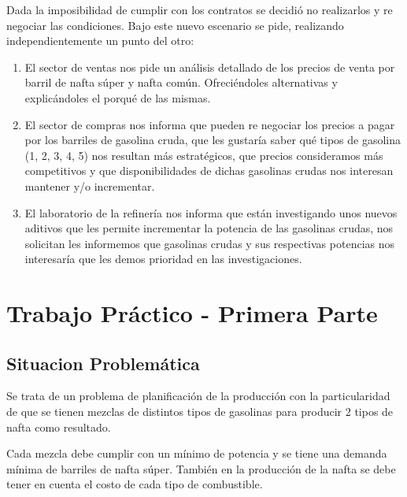 \documentclass[
]{article}
\begin{document}
Dada la imposibilidad de cumplir con los contratos se decidió no
realizarlos y re negociar las condiciones. Bajo este nuevo escenario se
pide, realizando independientemente un punto del otro:

\begin{enumerate}
\def\labelenumi{\arabic{enumi}.}
\item
  El sector de ventas nos pide un análisis detallado de los precios de
  venta por barril de nafta súper y nafta común. Ofreciéndoles
  alternativas y explicándoles el porqué de las mismas.
\item
  El sector de compras nos informa que pueden re negociar los precios a
  pagar por los barriles de gasolina cruda, que les gustaría saber qué
  tipos de gasolina (1, 2, 3, 4, 5) nos resultan más estratégicos, que
  precios consideramos más competitivos y que disponibilidades de dichas
  gasolinas crudas nos interesan mantener y/o incrementar.
\item
  El laboratorio de la refinería nos informa que están investigando unos
  nuevos aditivos que les permite incrementar la potencia de las
  gasolinas crudas, nos solicitan les informemos que gasolinas crudas y
  sus respectivas potencias nos interesaría que les demos prioridad en
  las investigaciones.
\end{enumerate}

\newpage

\hypertarget{trabajo-pruxe1ctico---primera-parte}{%
\section{Trabajo Práctico - Primera
Parte}\label{trabajo-pruxe1ctico---primera-parte}}

\hypertarget{situacion-problemuxe1tica}{%
\subsection{Situacion Problemática}\label{situacion-problemuxe1tica}}

Se trata de un problema de planificación de la producción con la
particularidad de que se tienen mezclas de distintos tipos de gasolinas
para producir 2 tipos de nafta como resultado.

Cada mezcla debe cumplir con un mínimo de potencia y se tiene una
demanda mínima de barriles de nafta súper. También en la producción de
la nafta se debe tener en cuenta el costo de cada tipo de combustible.
\end{document}
